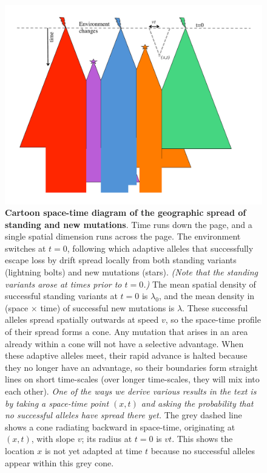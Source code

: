 \documentclass{article}
\newcommand{\gc}[1]{{\it\color{blue}#1}}
\begin{document}
\begin{figure}[ht]
  \begin{center}
    \includegraphics[width=\textwidth]{spreading_alleles_trimmed_2}
  \end{center}
  \caption{
{\bf Cartoon space-time diagram of the geographic spread of standing and new mutations}. 
Time runs down the page, and a single spatial dimension runs across the page. 
The environment switches at $t=0$, 
following which adaptive alleles that successfully escape loss by drift
spread locally from both standing variants (lightning bolts) and new
mutations (stars). \gc{(Note that the standing variants arose at times
prior to $t=0$.)}
The mean spatial density of successful standing variants at $t=0$ is $\lambda_0$,
and the mean density in (space $\times$ time) of successful new mutations is $\lambda$.
These successful alleles spread spatially outwards at speed $v$, 
so the space-time profile of their spread forms a cone. Any mutation
that arises in an area already within a cone will not have a selective advantage.
When these adaptive alleles meet, 
their rapid advance is halted because they no longer have an advantage,
so their boundaries form straight lines on short time-scales 
(over longer time-scales, they will mix into each other). 
\gc{One of the ways we derive various results in the text is by taking a
space-time point $(x,t)$ and asking the probability that no successful
alleles have spread there yet.} The grey dashed line shows a cone radiating backward in space-time,
originating at $(x,t)$, with slope $v$; its radius at $t=0$ is $v t$. 
This shows the location $x$ is not yet adapted at time $t$ because no successful alleles appear within this grey cone.
}
  \label{fig:cartoon}
\end{figure}
\end{document}
